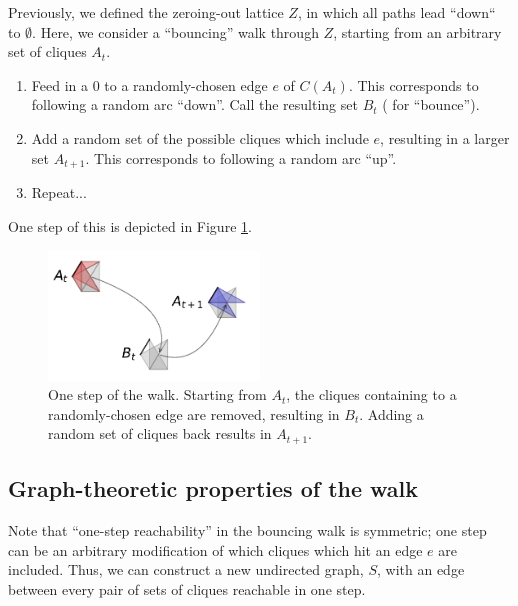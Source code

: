 \documentclass[12pt]{article}
\theoremstyle{definition}
\begin{document}
Previously, we defined the zeroing-out lattice $Z$, in which all paths lead
``down`` to $\emptyset$. Here, we consider a ``bouncing'' walk
through $Z$, starting from an arbitrary set of cliques $A_t$.

\begin{enumerate}

\item Feed in a 0 to a randomly-chosen edge $e$ of $C(A_t)$. 
This corresponds to
following a random arc ``down''. Call the resulting set $B_t$ (
for ``bounce'').

\item Add a random set of the possible cliques which include $e$,
resulting in a larger set $A_{t+1}$. This corresponds to following
a random arc ``up''.

\item Repeat...

\end{enumerate}

One step of this is depicted in Figure \ref{fig:boing}.

\begin{figure}

\centering

\includegraphics[width=0.5\textwidth]{bounce.pdf}

\caption{
One step of the walk. Starting from $A_t$, the cliques containing 
to a randomly-chosen edge are removed, resulting in $B_t$.
Adding a random set of cliques back results in $A_{t+1}$.
}
\label{fig:boing}

\end{figure}

\subsection{Graph-theoretic properties of the walk}
Note that ``one-step reachability'' in the bouncing walk is symmetric;
one step can be an arbitrary modification of which cliques which hit
an edge $e$ are included.
Thus, we can construct a new undirected graph, $S$, with an edge between every
pair of sets of cliques reachable in one step.
\end{document}
